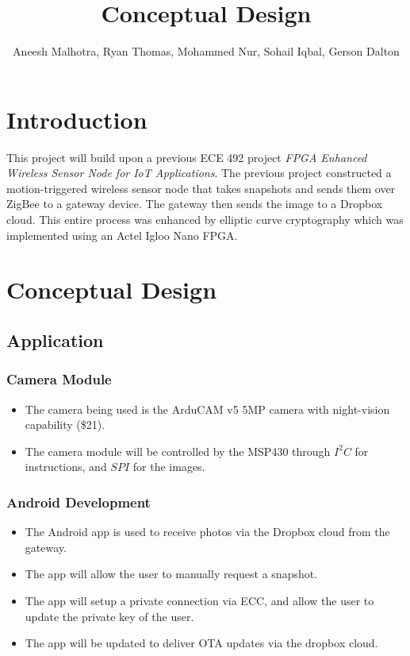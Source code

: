\documentclass[11pt]{article}
\title{Conceptual Design}
\author{Aneesh Malhotra, Ryan Thomas, Mohammed Nur, Sohail Iqbal, Gerson Dalton}
\begin{document}
\maketitle

\section{Introduction}
This project will build upon a previous ECE 492 project \textit{FPGA Enhanced Wireless Sensor Node for IoT Applications}. The previous project constructed a motion-triggered wireless sensor node that takes snapshots and sends them over ZigBee to a gateway device. The gateway then sends the image to a Dropbox cloud. This entire process was enhanced by elliptic curve cryptography which was implemented using an Actel Igloo Nano FPGA. 

\section{Conceptual Design}

\subsection{Application} 

\subsubsection{Camera Module}

\begin{itemize}
\item The camera being used is the ArduCAM v5 5MP camera with night-vision capability (\$21).
\item The camera module will be controlled by the MSP430 through $I^2C$ for instructions, and $SPI$  for the images.
\end{itemize}

\subsubsection{Android Development}

\begin{itemize}
\item The Android app is used to receive photos via the Dropbox cloud from the gateway.
\item The app will allow the user to manually request a snapshot.
\item The app will setup a private connection via ECC, and allow the user to update the private key of the user. 
\item The app will be updated to deliver OTA updates via the dropbox cloud.
\end{itemize}
\end{document}
